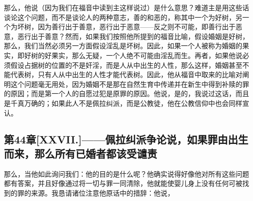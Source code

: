 那么，他说（因为我们在福音中读到主这样说过）是什么意思？难道主是用这些话谈论这个问题，而不是谈论人的两种意志，善的和恶的，称其中一个为好树，另一个为坏树，因为善行出于善意，恶行出于恶意——反之则不可能，即善行出于恶意，恶行出于善意？然而，如果我们按照他所提到的福音比喻，假设婚姻是好树，那么，我们当然必须另一方面假设淫乱是坏树。因此，如果一个人被称为婚姻的果实，即好树的好果实，那么无疑，一个人绝不可能由淫乱而生。再者，如果他说必须假设占据树的位置的不是奸淫，而是人从中出生的人性，那么这样，婚姻甚至不能代表树，只有人从中出生的人性才能代表树。因此，他从福音中取来的比喻对阐明这个问题毫无用处，因为婚姻不是那在自然生育中传递并在新生中得到补赎的罪的原因；而是第一个人的自愿过犯是原罪的原因。他说，是的，我说过这话，而且是千真万确的；如果此人不是佩拉纠派，而是公教徒，他在公教信仰中也会同样宣认。\par


\subsection{第44章[XXVII.]——佩拉纠派争论说，如果罪由出生而来，那么所有已婚者都该受谴责}

那么，当他如此询问我们：他的目的是什么呢？他确实说得好像他对所有这些问题都有答案，并且好像通过将一切与罪一同清除，他就能使婴儿身上没有任何可被找到的罪的来源。我恳请诸位注意他原话中的措辞：他说，\par


